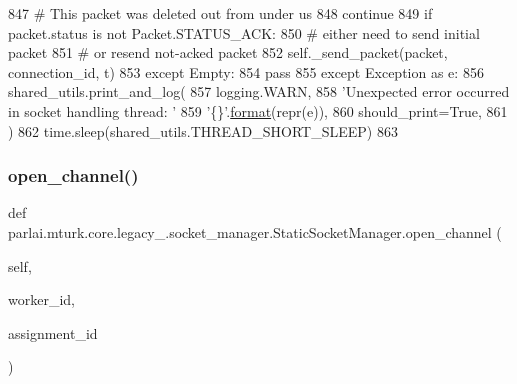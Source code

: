 \begin{DoxyCode}
847                                 \textcolor{comment}{# This packet was deleted out from under us}
848                                 \textcolor{keywordflow}{continue}
849                             \textcolor{keywordflow}{if} packet.status \textcolor{keywordflow}{is} \textcolor{keywordflow}{not} Packet.STATUS\_ACK:
850                                 \textcolor{comment}{# either need to send initial packet}
851                                 \textcolor{comment}{# or resend not-acked packet}
852                                 self.\_send\_packet(packet, connection\_id, t)
853                     \textcolor{keywordflow}{except} Empty:
854                         \textcolor{keywordflow}{pass}
855                 \textcolor{keywordflow}{except} Exception \textcolor{keyword}{as} e:
856                     shared\_utils.print\_and\_log(
857                         logging.WARN,
858                         \textcolor{stringliteral}{'Unexpected error occurred in socket handling thread: '}
859                         \textcolor{stringliteral}{'\{\}'}.\hyperlink{namespaceparlai_1_1chat__service_1_1services_1_1messenger_1_1shared__utils_a32e2e2022b824fbaf80c747160b52a76}{format}(repr(e)),
860                         should\_print=\textcolor{keyword}{True},
861                     )
862             time.sleep(shared\_utils.THREAD\_SHORT\_SLEEP)
863 
\end{DoxyCode}
\mbox{\label{classparlai_1_1mturk_1_1core_1_1legacy__2018_1_1socket__manager_1_1StaticSocketManager_ac5de566ae19796033224e18fdd86e5b9}} 
\subsubsection{\texorpdfstring{open\+\_\+channel()}{open\_channel()}}
{\footnotesize\ttfamily def parlai.\+mturk.\+core.\+legacy\+\_.\+socket\+\_\+manager.\+Static\+Socket\+Manager.\+open\+\_\+channel (\begin{DoxyParamCaption}\item[{}]{self,  }\item[{}]{worker\+\_\+id,  }\item[{}]{assignment\+\_\+id }\end{DoxyParamCaption})}


